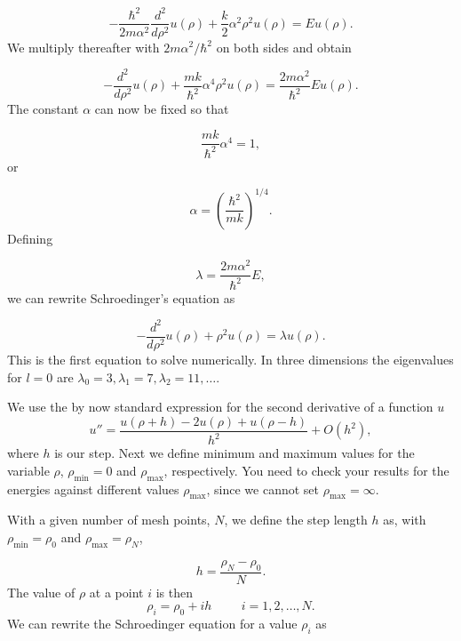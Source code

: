 \documentclass{article}
\begin{document}
\begin{equation*}
  -\frac{\hbar^2}{2 m \alpha^2} \frac{d^2}{d\rho^2} u(\rho) 
       + \frac{k}{2} \alpha^2\rho^2u(\rho)  = E u(\rho) .
\end{equation*}
We multiply thereafter with $2m\alpha^2/\hbar^2$ on both sides and obtain

\begin{equation*}
  -\frac{d^2}{d\rho^2} u(\rho) 
       + \frac{mk}{\hbar^2} \alpha^4\rho^2u(\rho)  = \frac{2m\alpha^2}{\hbar^2}E u(\rho) .
\end{equation*}
The constant $\alpha$ can now be fixed
so that

\begin{equation*}
\frac{mk}{\hbar^2} \alpha^4 = 1,
\end{equation*}
or

\begin{equation*}
\alpha = \left(\frac{\hbar^2}{mk}\right)^{1/4}.
\end{equation*}
Defining

\begin{equation*}
\lambda = \frac{2m\alpha^2}{\hbar^2}E,
\end{equation*}
we can rewrite Schroedinger's equation as

\begin{equation*}
  -\frac{d^2}{d\rho^2} u(\rho) + \rho^2u(\rho)  = \lambda u(\rho) .
\end{equation*}
This is the first equation to solve numerically. In three dimensions 
the eigenvalues for $l=0$ are 
$\lambda_0=3,\lambda_1=7,\lambda_2=11,\dots .$

We use the by now standard
expression for the second derivative of a function $u$
\begin{equation}
    u''=\frac{u(\rho+h) -2u(\rho) +u(\rho-h)}{h^2} +O(h^2),
    \label{eq:diffoperation}
\end{equation}
where $h$ is our step.
Next we define minimum and maximum values for the variable $\rho$,
$\rho_{\mathrm{min}}=0$  and $\rho_{\mathrm{max}}$, respectively.
You need to check your results for the energies against different values
$\rho_{\mathrm{max}}$, since we cannot set
$\rho_{\mathrm{max}}=\infty$. 

With a given number of mesh points, $N$, we 
define the step length $h$ as, with $\rho_{\mathrm{min}}=\rho_0$  and $\rho_{\mathrm{max}}=\rho_N$,

\begin{equation*}
  h=\frac{\rho_N-\rho_0 }{N}.
\end{equation*}
The value of $\rho$ at a point $i$ is then 
\[
    \rho_i= \rho_0 + ih \hspace{1cm} i=1,2,\dots , N.
\]
We can rewrite the Schroedinger equation for a value $\rho_i$ as
\end{document}
